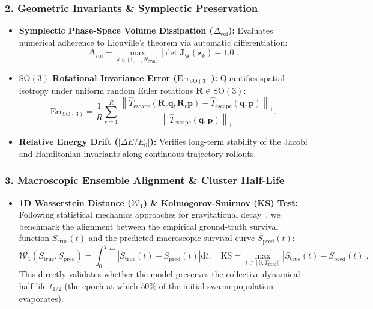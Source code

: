 \documentclass[preprint,12pt,3p]{elsarticle}
\begin{document}
\subsubsection{2. Geometric Invariants \& Symplectic Preservation}
\begin{itemize}
    \item \textbf{Symplectic Phase-Space Volume Dissipation ($\Delta_{\mathrm{vol}}$):} Evaluates numerical adherence to Liouville's theorem via automatic differentiation:
    \begin{equation}
    \Delta_{\mathrm{vol}} = \max_{k \in \{1, \dots, N_{\mathrm{eval}}\}} \left| \det \bm{J}_{\bm{\Psi}}(\bm{z}_k) - 1.0 \right|.
    \end{equation}
    \item \textbf{$\mathrm{SO}(3)$ Rotational Invariance Error ($\mathrm{Err}_{\mathrm{SO}(3)}$):} Quantifies spatial isotropy under uniform random Euler rotations $\bm{R} \in \mathrm{SO}(3)$:
    \begin{equation}
    \mathrm{Err}_{\mathrm{SO}(3)} = \frac{1}{R} \sum_{r=1}^{R} \frac{\left\| \hat{T}_{\mathrm{escape}}(\bm{R}_r \bm{q}, \bm{R}_r \bm{p}) - \hat{T}_{\mathrm{escape}}(\bm{q}, \bm{p}) \right\|_1}{\left\| \hat{T}_{\mathrm{escape}}(\bm{q}, \bm{p}) \right\|_1}.
    \end{equation}
    \item \textbf{Relative Energy Drift ($|\Delta E / E_0|$):} Verifies long-term stability of the Jacobi and Hamiltonian invariants along continuous trajectory rollouts.
\end{itemize}

\subsubsection{3. Macroscopic Ensemble Alignment \& Cluster Half-Life}
\begin{itemize}
    \item \textbf{1D Wasserstein Distance ($\mathcal{W}_1$) \& Kolmogorov-Smirnov (KS) Test:}
    Following statistical mechanics approaches for gravitational decay~\cite{stone2019statistical,heggie1975binary}, we benchmark the alignment between the empirical ground-truth survival function $S_{\mathrm{true}}(t)$ and the predicted macroscopic survival curve $S_{\mathrm{pred}}(t)$:
    \begin{equation}
    \mathcal{W}_1(S_{\mathrm{true}}, S_{\mathrm{pred}}) = \int_0^{T_{\max}} \left| S_{\mathrm{true}}(t) - S_{\mathrm{pred}}(t) \right| \mathrm{d}t, \quad \mathrm{KS} = \max_{t \in [0, T_{\max}]} \left| S_{\mathrm{true}}(t) - S_{\mathrm{pred}}(t) \right|.
    \end{equation}
    This directly validates whether the model preserves the collective dynamical half-life $t_{1/2}$ (the epoch at which $50\%$ of the initial swarm population evaporates).
\end{itemize}
\end{document}
